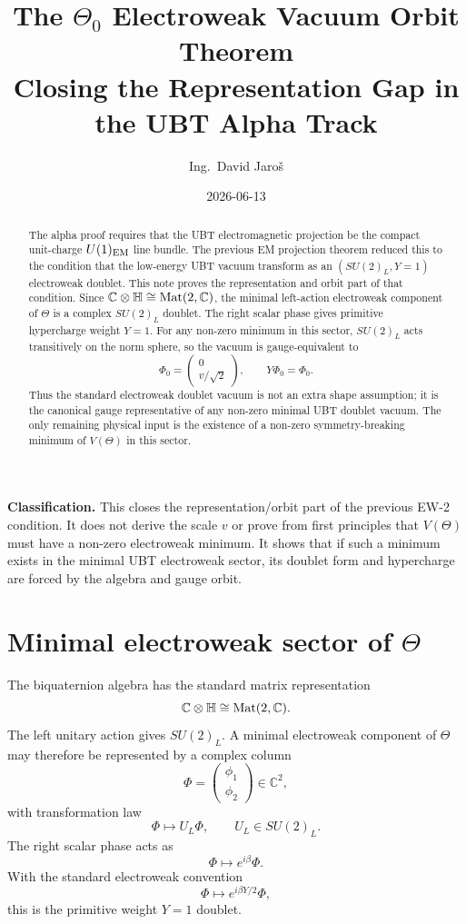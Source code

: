 \documentclass[12pt,a4paper]{article}
\title{The $\Theta_0$ Electroweak Vacuum Orbit Theorem\\
       \large Closing the Representation Gap in the UBT Alpha Track}
\author{Ing.\ David Jaro\v{s}}
\date{2026-06-13}
\begin{document}
\maketitle
\fi

\begin{abstract}
The alpha proof requires that the UBT electromagnetic projection be the compact
unit-charge \(U(1)_{\rm EM}\) line bundle.  The previous EM projection theorem
reduced this to the condition that the low-energy UBT vacuum transform as an
\((SU(2)_L,Y=1)\) electroweak doublet.  This note proves the representation and
orbit part of that condition.  Since
\(\mathbb C\otimes\mathbb H\cong {\rm Mat}(2,\mathbb C)\), the minimal
left-action electroweak component of \(\Theta\) is a complex \(SU(2)_L\)
doublet.  The right scalar phase gives primitive hypercharge weight \(Y=1\).
For any non-zero minimum in this sector, \(SU(2)_L\) acts transitively on the
norm sphere, so the vacuum is gauge-equivalent to
\[
  \Phi_0=\begin{pmatrix}0\\ v/\sqrt2\end{pmatrix},
  \qquad Y\Phi_0=\Phi_0.
\]
Thus the standard electroweak doublet vacuum is not an extra shape assumption;
it is the canonical gauge representative of any non-zero minimal UBT doublet
vacuum.  The only remaining physical input is the existence of a non-zero
symmetry-breaking minimum of \(V(\Theta)\) in this sector.
\end{abstract}

\begin{statusbox}
\textbf{Classification.} This closes the representation/orbit part of the
previous EW-2 condition.  It does not derive the scale \(v\) or prove from first
principles that \(V(\Theta)\) must have a non-zero electroweak minimum.  It shows
that if such a minimum exists in the minimal UBT electroweak sector, its doublet
form and hypercharge are forced by the algebra and gauge orbit.
\end{statusbox}

\section{Minimal electroweak sector of $\Theta$}

The biquaternion algebra has the standard matrix representation
\[
  \mathbb C\otimes\mathbb H \cong {\rm Mat}(2,\mathbb C).
\]
The left unitary action gives \(SU(2)_L\).  A minimal electroweak component of
\(\Theta\) may therefore be represented by a complex column
\[
  \Phi=\begin{pmatrix}\phi_1\\ \phi_2\end{pmatrix}\in\mathbb C^2,
\]
with transformation law
\[
  \Phi\mapsto U_L\Phi,
  \qquad U_L\in SU(2)_L.
\]
The right scalar phase acts as
\[
  \Phi\mapsto e^{i\beta}\Phi.
\]
With the standard electroweak convention
\[
  \Phi\mapsto e^{i\beta Y/2}\Phi,
\]
this is the primitive weight \(Y=1\) doublet.
\end{document}
